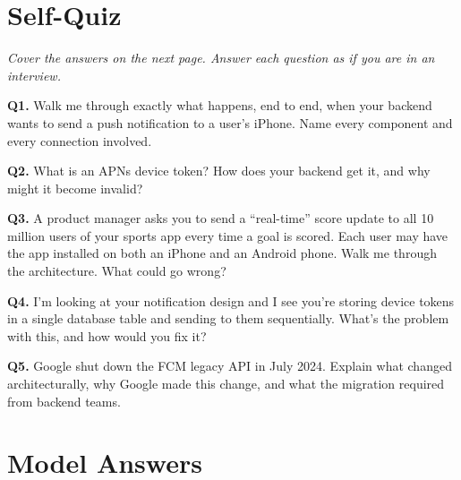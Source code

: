 \documentclass[11pt,a4paper]{article}
\begin{document}
\section{Self-Quiz}

\textit{Cover the answers on the next page. Answer each question as if you are in an interview.}

\bigskip

\begin{quizbox}
\textbf{Q1.} Walk me through exactly what happens, end to end, when your backend wants to send a push notification to a user's iPhone. Name every component and every connection involved.

\bigskip
\textbf{Q2.} What is an APNs device token? How does your backend get it, and why might it become invalid?

\bigskip
\textbf{Q3.} A product manager asks you to send a ``real-time'' score update to all 10 million users of your sports app every time a goal is scored. Each user may have the app installed on both an iPhone and an Android phone. Walk me through the architecture. What could go wrong?

\bigskip
\textbf{Q4.} I'm looking at your notification design and I see you're storing device tokens in a single database table and sending to them sequentially. What's the problem with this, and how would you fix it?

\bigskip
\textbf{Q5.} Google shut down the FCM legacy API in July 2024. Explain what changed architecturally, why Google made this change, and what the migration required from backend teams.
\end{quizbox}

\newpage

\section*{Model Answers}
\end{document}
